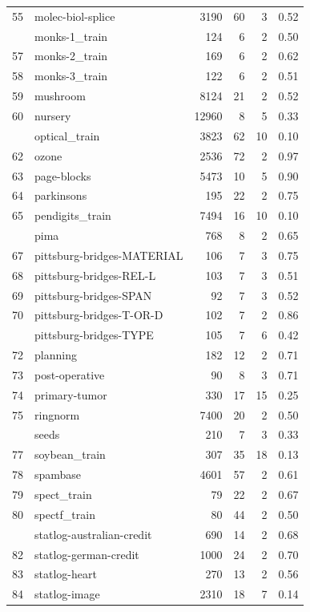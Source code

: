 \documentclass[]{elsarticle} %
\begin{document}
\begin{longtable}[t]{rlrrrr}
55 & molec-biol-splice & 3190 & 60 & 3 & 0.52\\
\addlinespace
56 & monks-1\_train & 124 & 6 & 2 & 0.50\\
57 & monks-2\_train & 169 & 6 & 2 & 0.62\\
58 & monks-3\_train & 122 & 6 & 2 & 0.51\\
59 & mushroom & 8124 & 21 & 2 & 0.52\\
60 & nursery & 12960 & 8 & 5 & 0.33\\
\addlinespace
61 & optical\_train & 3823 & 62 & 10 & 0.10\\
62 & ozone & 2536 & 72 & 2 & 0.97\\
63 & page-blocks & 5473 & 10 & 5 & 0.90\\
64 & parkinsons & 195 & 22 & 2 & 0.75\\
65 & pendigits\_train & 7494 & 16 & 10 & 0.10\\
\addlinespace
66 & pima & 768 & 8 & 2 & 0.65\\
67 & pittsburg-bridges-MATERIAL & 106 & 7 & 3 & 0.75\\
68 & pittsburg-bridges-REL-L & 103 & 7 & 3 & 0.51\\
69 & pittsburg-bridges-SPAN & 92 & 7 & 3 & 0.52\\
70 & pittsburg-bridges-T-OR-D & 102 & 7 & 2 & 0.86\\
\addlinespace
71 & pittsburg-bridges-TYPE & 105 & 7 & 6 & 0.42\\
72 & planning & 182 & 12 & 2 & 0.71\\
73 & post-operative & 90 & 8 & 3 & 0.71\\
74 & primary-tumor & 330 & 17 & 15 & 0.25\\
75 & ringnorm & 7400 & 20 & 2 & 0.50\\
\addlinespace
76 & seeds & 210 & 7 & 3 & 0.33\\
77 & soybean\_train & 307 & 35 & 18 & 0.13\\
78 & spambase & 4601 & 57 & 2 & 0.61\\
79 & spect\_train & 79 & 22 & 2 & 0.67\\
80 & spectf\_train & 80 & 44 & 2 & 0.50\\
\addlinespace
81 & statlog-australian-credit & 690 & 14 & 2 & 0.68\\
82 & statlog-german-credit & 1000 & 24 & 2 & 0.70\\
83 & statlog-heart & 270 & 13 & 2 & 0.56\\
84 & statlog-image & 2310 & 18 & 7 & 0.14\\

\end{longtable}
\end{document}
